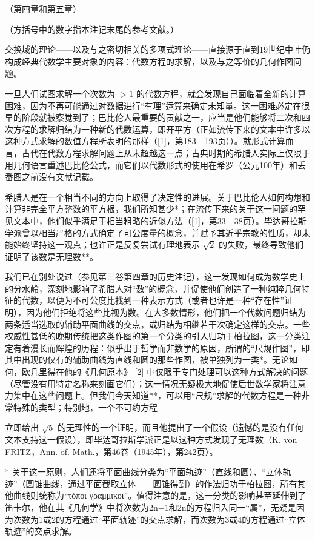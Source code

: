 
（第四章和第五章）

（方括号中的数字指本注记末尾的参考文献。）

交换域的理论——以及与之密切相关的多项式理论——直接源于直到19世纪中叶仍构成经典代数学主要对象的内容：代数方程的求解，以及与之等价的几何作图问题。

一旦人们试图求解一个次数为 \(>1\) 的代数方程，就会发现自己面临着全新的计算困难，因为不再可能通过对数据进行“有理”运算来确定未知量。这一困难必定在很早的阶段就被察觉到了；巴比伦人最重要的贡献之一，应当是他们能够将二次和四次方程的求解归结为一种新的代数运算，即开平方（正如流传下来的文本中许多以这种方式求解的数值方程所表明的那样（{[}1{]}，第183—193页））。就形式计算而言，古代在代数方程求解问题上从未超越这一点；古典时期的希腊人实际上仅限于用几何语言重述巴比伦公式，而它们以代数形式的使用在希罗（公元100年）和丢番图之前没有文献记载。

希腊人是在一个相当不同的方向上取得了决定性的进展。关于巴比伦人如何构想和计算非完全平方整数的平方根，我们所知甚少*；在流传下来的关于这一问题的罕见文本中，他们似乎满足于相当粗略的近似方法（{[}1{]}，第33—38页）。毕达哥拉斯学派曾以相当严格的方式确定了可公度量的概念，并赋予其近乎宗教的性质，却未能始终坚持这一观点；也许正是反复尝试有理地表示 \(\sqrt{2}\) 的失败，最终导致他们证明了该数是无理数**。

我们已在别处说过（参见第三卷第四章的历史注记），这一发现如何成为数学史上的分水岭，深刻地影响了希腊人对“数”的概念，并促使他们创造了一种纯粹几何特征的代数，以便为不可公度比找到一种表示方式（或者也许是一种“存在性”证明），因为他们拒绝将这些比视为数。在大多数情形，他们把一个代数问题归结为两条适当选取的辅助平面曲线的交点，或归结为相继若干次确定这样的交点。一些权威性甚低的晚期传统把这类作图的第一个分类的引入归功于柏拉图，这一分类注定有着漫长而辉煌的历程：似乎出于哲学而非数学的原因，所谓的“尺规作图”，即其中出现的仅有的辅助曲线为直线和圆的那些作图，被单独列为一类*。无论如何，欧几里得在他的《几何原本》 {[}2{]} 中仅限于专门处理可以这种方式解决的问题（尽管没有用特定名称来刻画它们）；这一情况无疑极大地促使后世数学家将注意力集中在这些问题上。但我们今天知道**，可以用“尺规”求解的代数方程是一种非常特殊的类型；特别地，一个不可约方程

立即给出 \(\sqrt{5}\) 的无理性的一个证明，而且他提出了一个假设（遗憾的是没有任何文本支持这一假设），即毕达哥拉斯学派正是以这种方式发现了无理数（K. von FRITZ，Ann. of. Math.，第46卷（1945年），第242页）。

* 关于这一原则，人们还将平面曲线分类为“平面轨迹”（直线和圆）、“立体轨迹”（圆锥曲线，通过平面截取立体——圆锥得到）的作法归功于柏拉图，所有其他曲线则统称为“τόποι γραμμικοι”。值得注意的是，这一分类的影响甚至延伸到了笛卡尔，他在其《几何学》中将次数为2n−1和2n的方程归入同一“属”，无疑是因为次数为1或2的方程通过“平面轨迹”的交点求解，而次数为3或4的方程通过“立体轨迹”的交点求解。

